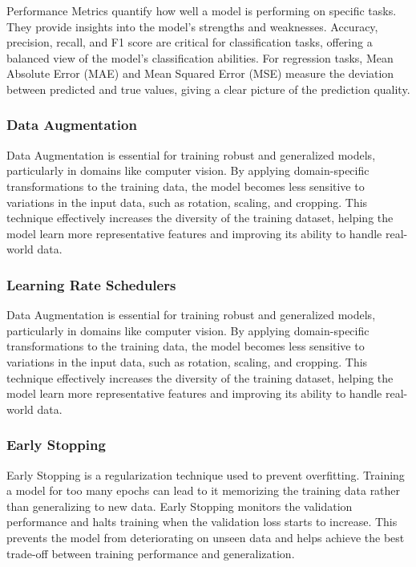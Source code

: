 Performance Metrics quantify how well a model is performing on specific tasks. They provide insights into the model's strengths and weaknesses. Accuracy, precision, recall, and F1 score are critical for classification tasks, offering a balanced view of the model's classification abilities. For regression tasks, Mean Absolute Error (MAE) and Mean Squared Error (MSE) measure the deviation between predicted and true values, giving a clear picture of the prediction quality.
\subsubsection*{Data Augmentation}

Data Augmentation is essential for training robust and generalized models, particularly in domains like computer vision. By applying domain-specific transformations to the training data, the model becomes less sensitive to variations in the input data, such as rotation, scaling, and cropping. This technique effectively increases the diversity of the training dataset, helping the model learn more representative features and improving its ability to handle real-world data.
\subsubsection*{Learning Rate Schedulers}

Data Augmentation is essential for training robust and generalized models, particularly in domains like computer vision. By applying domain-specific transformations to the training data, the model becomes less sensitive to variations in the input data, such as rotation, scaling, and cropping. This technique effectively increases the diversity of the training dataset, helping the model learn more representative features and improving its ability to handle real-world data.
\subsubsection*{Early Stopping}

Early Stopping is a regularization technique used to prevent overfitting. Training a model for too many epochs can lead to it memorizing the training data rather than generalizing to new data. Early Stopping monitors the validation performance and halts training when the validation loss starts to increase. This prevents the model from deteriorating on unseen data and helps achieve the best trade-off between training performance and generalization.




